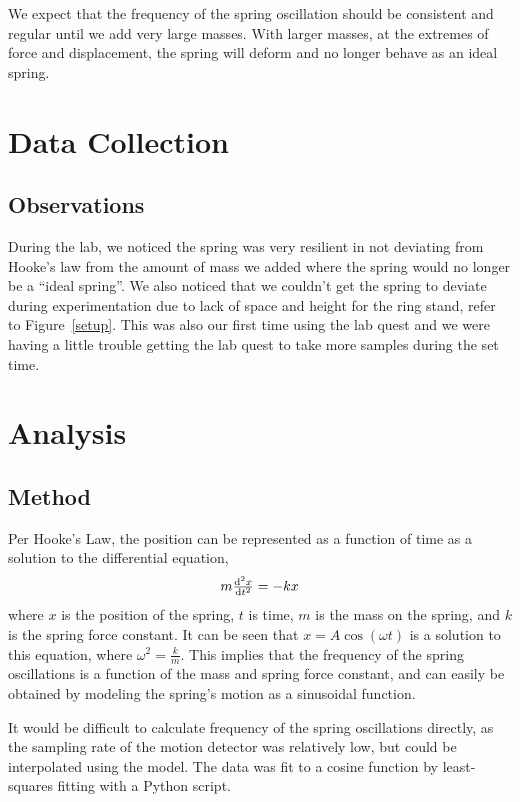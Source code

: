 \documentclass{article}
\numberwithin{figure}{section}
\numberwithin{table}{section}
\begin{document}
We expect that the frequency of the spring oscillation should be consistent and regular until we add very large masses.  With larger masses, at the extremes of force and displacement, the spring will deform and no longer behave as an ideal spring. 

\section{Data Collection} 

\subsection{Observations} 

During the lab, we noticed the spring was very resilient in not deviating from Hooke’s law from the amount of mass we added where the spring would no longer be a “ideal spring”. We also noticed that we couldn’t get the spring to deviate during experimentation due to lack of space and height for the ring stand, refer to Figure~\ref{setup}. This was also our first time using the lab quest and we were having a little trouble getting the lab quest to take more samples during the set time.

\section{Analysis} 

\subsection{Method} 

Per Hooke's Law, the position can be represented as a function of time as a solution to the differential equation, 
\begin{equation} 
	m \od[2]{x}{t} = -kx 
\end{equation} 
where $x$ is the position of the spring, $t$ is time, $m$ is the mass on the spring, and $k$ is the spring force constant.  It can be seen that $x = A \cos \left( \omega t \right)$ is a solution to this equation, where $\omega^2 = \frac{k}{m}$.  This implies that the frequency of the spring oscillations is a function of the mass and spring force constant, and can easily be obtained by modeling the spring's motion as a sinusoidal function.

It would be difficult to calculate frequency of the spring oscillations directly, as the sampling rate of the motion detector was relatively low, but could be interpolated using the model.  The data was fit to a cosine function by least-squares fitting with a Python script.
\end{document}
